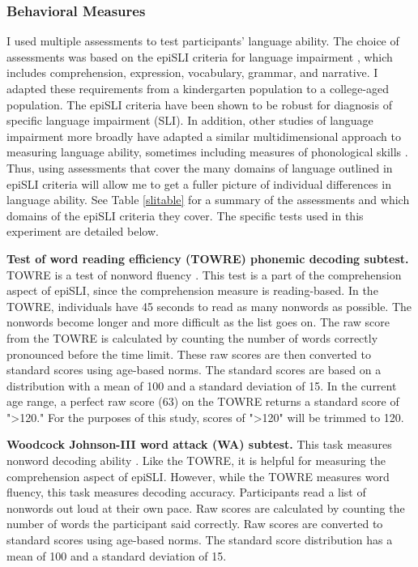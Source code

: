 \documentclass[../dissertation.tex]{subfiles}
\begin{document}
\subsubsection{Behavioral Measures}
	I used multiple assessments to test participants' language ability.  The choice of assessments was based on the epiSLI criteria for language impairment \citep{Tomblin1996}, which includes comprehension, expression, vocabulary, grammar, and narrative. I adapted these requirements from a kindergarten population to a college-aged population. The epiSLI criteria have been shown to be robust for diagnosis of specific language impairment (SLI). In addition, other studies of language impairment more broadly have adapted a similar multidimensional approach to measuring language ability, sometimes including measures of phonological skills \citep{Catts2006}. Thus, using assessments that cover the many domains of language outlined in epiSLI criteria will allow me to get a fuller picture of individual differences in language ability. See Table \ref{slitable} for a summary of the assessments and which domains of the epiSLI criteria they cover. The specific tests used in this experiment are detailed below. \par
	\textbf{Test of word reading efficiency (TOWRE) phonemic decoding subtest.} TOWRE is a test of nonword fluency \citep{Torgesen1992}. This test is a part of the comprehension aspect of epiSLI, since the comprehension measure is reading-based. In the TOWRE, individuals have 45 seconds to read as many nonwords as possible. The nonwords become longer and more difficult as the list goes on. The raw score from the TOWRE is calculated by counting the number of words correctly pronounced before the time limit. These raw scores are then converted to standard scores using age-based norms. The standard scores are based on a distribution with a mean of 100 and a standard deviation of 15. In the current age range, a perfect raw score (63) on the TOWRE returns a standard score of "\textgreater 120." For the purposes of this study, scores of "\textgreater 120" will be trimmed to 120. \par
	\textbf{Woodcock Johnson-III word attack (WA) subtest.} This task measures nonword decoding ability \citep{Woodcock2001}. Like the TOWRE, it is helpful for measuring the comprehension aspect of epiSLI. However, while the TOWRE measures word fluency, this task measures decoding accuracy. Participants read a list of nonwords out loud at their own pace. Raw scores are calculated by counting the number of words the participant said correctly. Raw scores are converted to standard scores using age-based norms. The standard score distribution has a mean of 100 and a standard deviation of 15. \par
\end{document}
